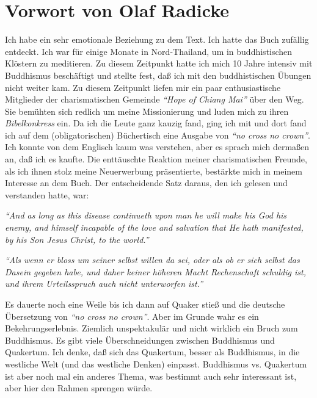\part{Vorwort von Olaf Radicke}


Ich habe ein sehr emotionale Beziehung zu dem Text. Ich hatte das Buch zufällig
entdeckt. Ich war für einige Monate in Nord-Thailand, um in buddhistischen
Klöstern zu meditieren. Zu diesem Zeitpunkt hatte ich mich 10 Jahre intensiv mit
Buddhismus beschäftigt und stellte fest, daß ich mit den buddhistischen Übungen
nicht weiter kam. Zu diesem Zeitpunkt liefen mir ein paar enthusiastische
Mitglieder der charismatischen Gemeinde \textit{"`Hope of Chiang Mai"'} über
den Weg. Sie bemühten sich redlich um meine Missionierung und luden mich zu
ihren \textit{Bibelkonkress} ein. Da ich die Leute ganz kauzig fand, ging ich
mit und dort fand ich auf dem (obligatorischen) Büchertisch eine Ausgabe
von \textit{"`no cross no crown"'}.
Ich konnte von dem Englisch kaum was verstehen, aber es sprach mich dermaßen
an, daß ich es kaufte. Die enttäuschte Reaktion meiner charismatischen Freunde,
als ich ihnen stolz meine Neuerwerbung präsentierte, bestärkte mich in meinem
Interesse an dem Buch. Der entscheidende Satz daraus, den ich gelesen und
verstanden hatte, war:

\begin{center}
\parbox{7,5cm}{
\textit{"`And as long as this disease continueth upon man he will make his God
his enemy, and himself incapable of the love and salvation that He hath
manifested, by his Son Jesus Christ, to the world."'}

\medskip

\textit{"`Als wenn er bloss um seiner selbst willen da sei, oder als ob er
sich selbst das Dasein gegeben habe, und daher keiner höheren Macht Rechenschaft
schuldig ist, und ihrem Urteilsspruch auch nicht unterworfen ist."'}
}
\end{center}

\medskip

Es dauerte noch eine Weile bis ich dann auf Quaker stieß und die deutsche
Übersetzung von \textit{"`no cross no crown"'}. Aber im Grunde wahr es ein
Bekehrungserlebnis. Ziemlich unspektakulär und nicht wirklich ein Bruch zum
Buddhismus. Es gibt viele Überschneidungen zwischen Buddhismus und Quakertum.
Ich denke, daß sich das Quakertum, besser als Buddhismus, in die westliche Welt (und das westliche
Denken) einpasst. Buddhismus vs. Quakertum ist aber noch mal
ein anderes Thema, was bestimmt auch sehr interessant ist, aber hier den Rahmen
sprengen würde.

